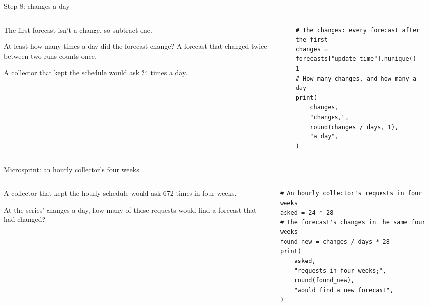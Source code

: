 \documentclass[9pt,aspectratio=169]{beamer}
\begin{document}
\begin{frame}[fragile]{Step 8: changes a day}
    \begin{columns}[T]
        \begin{column}{0.37\textwidth}
            The first forecast isn't a change, so subtract one.

            \medskip
            At least how many times a day did the forecast change? A forecast that changed twice between two runs counts once.

            \medskip
            A collector that kept the schedule would ask 24 times a day.
        \end{column}
        \begin{column}{0.6\textwidth}
\begin{lstlisting}
# The changes: every forecast after the first
changes = forecasts["update_time"].nunique() - 1
# How many changes, and how many a day
print(
    changes,
    "changes,",
    round(changes / days, 1),
    "a day",
)
\end{lstlisting}
        \end{column}
    \end{columns}
\end{frame}

\begin{frame}[fragile]{Microsprint: an hourly collector's four weeks}
    \begin{columns}[T]
        \begin{column}{0.37\textwidth}
            A collector that kept the hourly schedule would ask 672 times in four weeks.

            \medskip
            At the series' changes a day, how many of those requests would find a forecast that had changed?
        \end{column}
        \begin{column}{0.6\textwidth}
\begin{lstlisting}
# An hourly collector's requests in four weeks
asked = 24 * 28
# The forecast's changes in the same four weeks
found_new = changes / days * 28
print(
    asked,
    "requests in four weeks;",
    round(found_new),
    "would find a new forecast",
)
\end{lstlisting}
        \end{column}
    \end{columns}
\end{frame}
\end{document}
